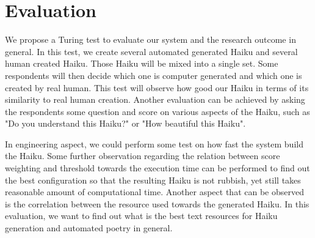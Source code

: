 \section{Evaluation}

We propose a Turing test to evaluate our system and the research outcome in general. In this test, we create several automated generated Haiku and several human created Haiku. Those Haiku will be mixed into a single set. Some respondents will then decide which one is computer generated and which one is created by real human. This test will observe how good our Haiku in terms of its similarity to real human creation. Another evaluation can be achieved by asking the respondents some question and score on various aspects of the Haiku, such as "Do you understand this Haiku?" or "How beautiful this Haiku". 

In engineering aspect, we could perform some test on how fast the system build the Haiku. Some further observation regarding the relation between score weighting and threshold towards the execution time can be performed to find out the best configuration so that the resulting Haiku is not rubbish, yet still takes reasonable amount of computational time. Another aspect that can be observed is the correlation between the resource used towards the generated Haiku. In this evaluation, we want to find out what is the best text resources for Haiku generation and automated poetry in general.